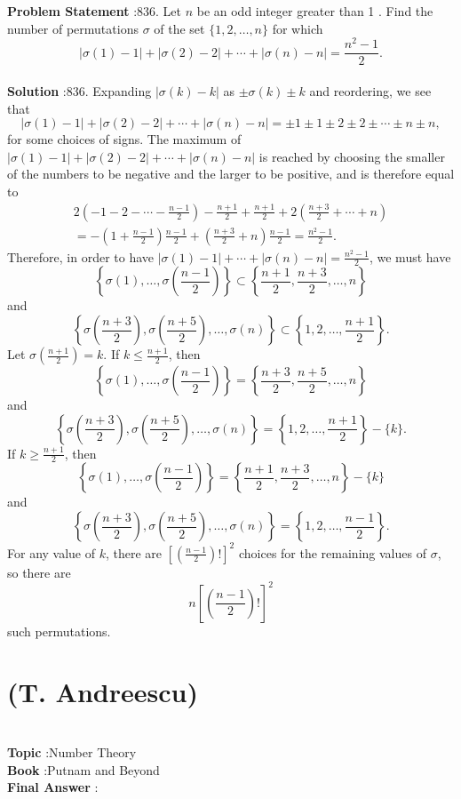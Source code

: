 \documentclass[10pt]{article}
\begin{document}
\textbf{Problem Statement} :836. Let $n$ be an odd integer greater than 1 . Find the number of permutations $\sigma$ of the set $\{1,2, \ldots, n\}$ for which$$ |\sigma(1)-1|+|\sigma(2)-2|+\cdots+|\sigma(n)-n|=\frac{n^{2}-1}{2} . $$\\
\textbf{Solution} :836. Expanding $|\sigma(k)-k|$ as $\pm \sigma(k) \pm k$ and reordering, we see that$$ |\sigma(1)-1|+|\sigma(2)-2|+\cdots+|\sigma(n)-n|=\pm 1 \pm 1 \pm 2 \pm 2 \pm \cdots \pm n \pm n, $$for some choices of signs. The maximum of $|\sigma(1)-1|+|\sigma(2)-2|+\cdots+|\sigma(n)-n|$ is reached by choosing the smaller of the numbers to be negative and the larger to be positive, and is therefore equal to$$ \begin{gathered} 2\left(-1-2-\cdots-\frac{n-1}{2}\right)-\frac{n+1}{2}+\frac{n+1}{2}+2\left(\frac{n+3}{2}+\cdots+n\right) \\ =-\left(1+\frac{n-1}{2}\right) \frac{n-1}{2}+\left(\frac{n+3}{2}+n\right) \frac{n-1}{2}=\frac{n^{2}-1}{2} . \end{gathered} $$Therefore, in order to have $|\sigma(1)-1|+\cdots+|\sigma(n)-n|=\frac{n^{2}-1}{2}$, we must have$$ \left\{\sigma(1), \ldots, \sigma\left(\frac{n-1}{2}\right)\right\} \subset\left\{\frac{n+1}{2}, \frac{n+3}{2}, \ldots, n\right\} $$and $$ \left\{\sigma\left(\frac{n+3}{2}\right), \sigma\left(\frac{n+5}{2}\right), \ldots, \sigma(n)\right\} \subset\left\{1,2, \ldots, \frac{n+1}{2}\right\} . $$Let $\sigma\left(\frac{n+1}{2}\right)=k$. If $k \leq \frac{n+1}{2}$, then$$ \left\{\sigma(1), \ldots, \sigma\left(\frac{n-1}{2}\right)\right\}=\left\{\frac{n+3}{2}, \frac{n+5}{2}, \ldots, n\right\} $$and$$ \left\{\sigma\left(\frac{n+3}{2}\right), \sigma\left(\frac{n+5}{2}\right), \ldots, \sigma(n)\right\}=\left\{1,2, \ldots, \frac{n+1}{2}\right\}-\{k\} . $$If $k \geq \frac{n+1}{2}$, then$$ \left\{\sigma(1), \ldots, \sigma\left(\frac{n-1}{2}\right)\right\}=\left\{\frac{n+1}{2}, \frac{n+3}{2}, \ldots, n\right\}-\{k\} $$and$$ \left\{\sigma\left(\frac{n+3}{2}\right), \sigma\left(\frac{n+5}{2}\right), \ldots, \sigma(n)\right\}=\left\{1,2, \ldots, \frac{n-1}{2}\right\} . $$For any value of $k$, there are $\left[\left(\frac{n-1}{2}\right) !\right]^{2}$ choices for the remaining values of $\sigma$, so there are$$ n\left[\left(\frac{n-1}{2}\right) !\right]^{2} $$such permutations.\section{(T. Andreescu)}\\
\textbf{Topic} :Number Theory\\
\textbf{Book} :Putnam and Beyond\\
\textbf{Final Answer} :\\
\end{document}

